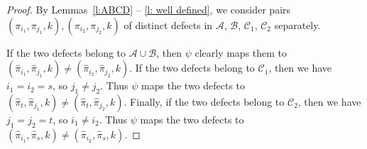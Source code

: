 \documentclass[12pt]{amsart}
\theoremstyle{definition}
\numberwithin{equation}{section}
\newcommand{\A}{\mathcal{A}}
\newcommand{\B}{\mathcal{B}}
\newcommand{\C}{\mathcal{C}}
\newcommand{\D}{\mathcal{D}}
\begin{document}
\begin{proof}
By Lemmas~\ref{l:ABCD} -- \ref{l: well defined}, we consider pairs $(\pi_{i_1}, \pi_{j_1}, k) , (\pi_{i_2}, \pi_{j_2}, k)$ of distinct defects in $\A$, $\B$, $\C_1$, $\C_2$ separately.

If the two defects belong to $\A \cup \B$, then $\psi$ clearly maps them 
to $(\hat\pi_{i_1}, \hat\pi_{j_1}, k) \neq (\hat\pi_{i_2}, \hat\pi_{j_2}, k)$. 
If the two defects belong to $\C_1$, then we have
%
 $i_1 = i_2 = s$, so $j_1 \neq j_2$. Thus $\psi$ maps the two defects to %
 $(\hat\pi_t, \hat\pi_{j_1}, k) \neq (\hat\pi_t, \hat\pi_{j_2}, k)$. 
 Finally, if the two defects belong to $\C_2$, 
 then we have
$j_1 = j_2 = t$, so $i_1 \neq i_2$.  Thus $\psi$ maps the two defects to $(\hat\pi_{i_1}, \hat\pi_s, k) \neq (\hat\pi_{i_2}, \hat\pi_s, k)$. 
\end{proof}
\end{document}

